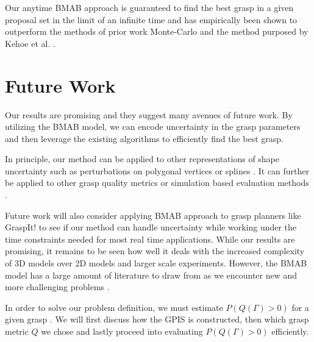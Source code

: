 \documentclass[journal,transmag]{IEEEtran}%
\begin{document}
Our anytime BMAB approach is guaranteed to find the best grasp in a given proposal set in the limit of an infinite time and has empirically been shown to outperform the methods of prior work Monte-Carlo and the method purposed by Kehoe et al. \cite{kehoe2012estimating}. 



\section{Future Work}
Our results are promising and they suggest many avenues of future work. By utilizing the BMAB model, we can encode uncertainty in the grasp parameters and then leverage the existing algorithms to efficiently find the best grasp. 

In principle, our method can be applied to other representations of shape uncertainty such as perturbations on polygonal vertices \cite{kehoe2012estimating} or splines \cite{christopoulos2007handling}.
It can further be applied to other grasp quality metrics or simulation based evaluation methods \cite{73}. 

Future work will also consider applying BMAB approach to grasp planners like GraspIt! \cite{miller2004graspit} to see if our method can handle uncertainty while working under the time constraints needed for most real time applications. While our results are promising, it remains to be seen how well it deals with the increased complexity of 3D models over 2D models and larger scale experiments. However, the BMAB model has a large amount of literature to draw from as we encounter new and more challenging problems \cite{bergemann2006bandit}.





 \label{sec:Appendix}
 In order to solve our problem definition, we must estimate $P(Q(\Gamma)>0)$ for a given grasp . We will first discuss how the GPIS is constructed, then which grasp metric $Q$ we chose and lastly proceed into evaluating $P(Q(\Gamma)>0)$ efficiently. 
\end{document}
